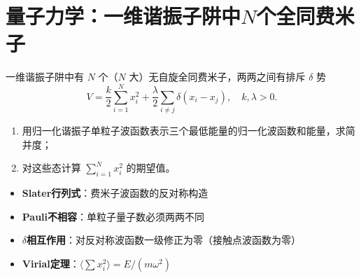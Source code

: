 \section{量子力学：一维谐振子阱中\texorpdfstring{$N$}{N}个全同费米子}
\label{sec:fermions-ho-trap}

\begin{modelbox}
一维谐振子阱中有 $N$ 个（$N$ 大）无自旋全同费米子，两两之间有排斥 $\delta$ 势
\[
V=\frac{k}{2}\sum_{i=1}^{N}x_i^2+\frac{\lambda}{2}\sum_{i\neq j}\delta(x_i-x_j),\quad k,\lambda>0.
\]
\begin{enumerate}
    \item 用归一化谐振子单粒子波函数表示三个最低能量的归一化波函数和能量，求简并度；
    \item 对这些态计算 $\sum_{i=1}^N x_i^2$ 的期望值。
\end{enumerate}
\end{modelbox}

\begin{tipbox}[考点快速分析]
\begin{itemize}
    \item \textbf{Slater行列式}：费米子波函数的反对称构造
    \item \textbf{Pauli不相容}：单粒子量子数必须两两不同
    \item \textbf{$\delta$相互作用}：对反对称波函数一级修正为零（接触点波函数为零）
    \item \textbf{Virial定理}：$\langle\sum x_i^2\rangle=E/(m\omega^2)$
\end{itemize}
\end{tipbox}

